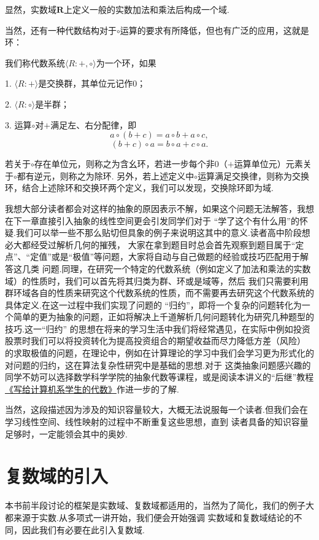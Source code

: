 显然，实数域$\mathbf{R}$上定义一般的实数加法和乘法后构成一个域.

当然，还有一种代数结构对于$\circ$运算的要求有所降低，但也有广泛的应用，这就是环：
\begin{definition}
	我们称代数系统$\langle R:+,\circ\rangle$为一个环，如果
	
	1. $\langle R:+\rangle$是交换群，其单位元记作0；

	2. $\langle R:\circ\rangle$是半群；

	3. 运算$\circ$对$+$满足左、右分配律，即
	$$a\circ(b+c)=a\circ b+a\circ c,$$
	$$(b+c)\circ a=b\circ a+c\circ a.$$
	
	若关于$\circ$存在单位元，则称之为含幺环，若进一步每个非0（$+$运算单位元）元素关于$\circ$都有逆元，则称之为除环.
	另外，若上述定义中$\circ$运算满足交换律，则称为交换环，结合上述除环和交换环两个定义，我们可以发现，交换除环即为域.
\end{definition}

我想大部分读者都会对这样的抽象的原因表示不解，如果这个问题无法解答，我想在下一章直接引入抽象的线性空间更会引发同学们对于
“学了这个有什么用”的怀疑.我们可以举一些不那么贴切但具象的例子来说明这其中的意义.读者高中阶段想必大都经受过解析几何的摧残，
大家在拿到题目时总会首先观察到题目属于“定点”、“定值”或是“极值”等问题，大家将自动与自己做题的经验或技巧匹配用于解答这几类
问题.同理，在研究一个特定的代数系统（例如定义了加法和乘法的实数域）的性质时，我们可以首先将其归类为群、环或是域等，然后
我们只需要利用群环域各自的性质来研究这个代数系统的性质，而不需要再去研究这个代数系统的具体定义.在这一过程中我们实现了问题的
“归约”，即将一个复杂的问题转化为一个简单的更为抽象的问题，正如将解决上千道解析几何问题转化为研究几种题型的技巧.这一“归约”
的思想在将来的学习生活中我们将经常遇见，在实际中例如投资股票时我们可以将投资转化为提高投资组合的期望收益而尽力降低方差（风险）
的求取极值的问题，在理论中，例如在计算理论的学习中我们会学习更为形式化的对问题的归约，这在算法复杂性研究中是基础的思想.对于
这类抽象问题感兴趣的同学不妨可以选择数学科学学院的抽象代数等课程，或是阅读本讲义的“后继”教程
\href{https://frightenedfoxcn.github.io/notes/series/alg-for-cs/}{《写给计算机系学生的代数》}作进一步的了解.

当然，这段描述因为涉及的知识容量较大，大概无法说服每一个读者.但我们会在学习线性空间、线性映射的过程中不断重复这些思想，直到
读者具备的知识容量足够时，一定能领会其中的奥妙.

\section{复数域的引入}
本书前半段讨论的框架是实数域、复数域都适用的，当然为了简化，我们的例子大都来源于实数.从多项式一讲开始，我们便会开始强调
实数域和复数域结论的不同，因此我们有必要在此引入复数域.

